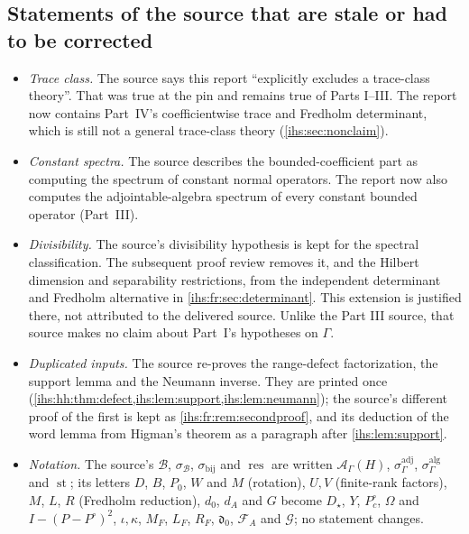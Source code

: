 \documentclass[11pt,a4paper]{article}
\numberwithin{equation}{section}
\theoremstyle{definition}
\theoremstyle{remark}
\newcommand{\Ahh}{\mathcal A_\Gamma(H)}
\newcommand{\st}{\operatorname{st}}
\begin{document}
\subsection{Statements of the source that are stale or had to be corrected}\label{ihs:app:staleD}
\begin{itemize}
\item \emph{Trace class.} The source says this report ``explicitly excludes
 a trace-class theory''. That was true at the pin and remains true of
 Parts I--III. The report now contains Part~IV's coefficientwise trace and
 Fredholm determinant, which is still not a general trace-class theory
 (\cref{ihs:sec:nonclaim}).
\item \emph{Constant spectra.} The source describes the bounded-coefficient
 part as computing the spectrum of constant normal operators. The report now
 also computes the adjointable-algebra spectrum of every constant bounded
 operator (Part~III).
\item \emph{Divisibility.} The source's divisibility hypothesis is kept for
 the spectral classification. The subsequent proof review removes it, and
 the Hilbert dimension and separability restrictions, from the independent
 determinant and Fredholm alternative in \cref{ihs:fr:sec:determinant}.
 This extension is justified there, not attributed to the delivered source.
 Unlike the Part III source, that source makes no claim about Part~I's
 hypotheses on $\Gamma$.
\item \emph{Duplicated inputs.} The source re-proves the range-defect
 factorization, the support lemma and the Neumann inverse. They are printed
 once (\cref{ihs:hh:thm:defect,ihs:lem:support,ihs:lem:neumann}); the
 source's different proof of the first is kept as
 \cref{ihs:fr:rem:secondproof}, and its deduction of the word lemma from
 Higman's theorem as a paragraph after \cref{ihs:lem:support}.
\item \emph{Notation.} The source's $\mathscr B$, $\sigma_{\mathscr B}$,
 $\sigma_{\mathrm{bij}}$ and $\operatorname{res}$ are written $\Ahh$,
 $\sigma^{\mathrm{adj}}_\Gamma$, $\sigma^{\mathrm{alg}}_\Gamma$ and $\st$;
 its letters $D$, $B$, $P_0$, $W$ and $M$ (rotation), $U,V$ (finite-rank
 factors), $M$, $L$, $R$ (Fredholm reduction), $d_0$, $d_A$ and $G$ become
 $D_\star$, $Y$, $P^\circ_c$, $\Omega$ and $I-(P-P^\circ)^2$, $\iota,\kappa$,
 $M_F$, $L_F$, $R_F$, $\mathfrak d_0$, $\mathcal F_A$ and $\mathcal G$; no
 statement changes.
\end{itemize}
\end{document}

